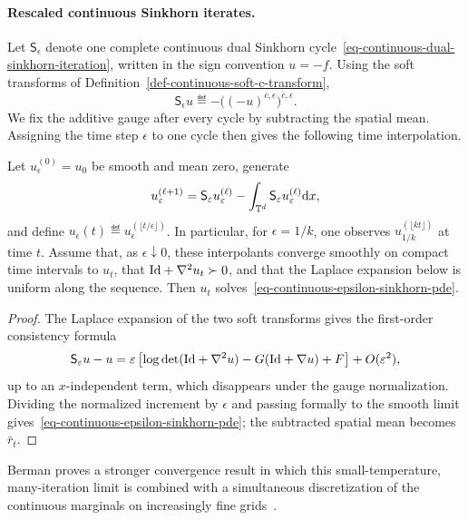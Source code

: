 \paragraph{Rescaled continuous Sinkhorn iterates.}

Let $\mathsf S_\epsilon$ denote one complete continuous dual Sinkhorn cycle~\eqref{eq-continuous-dual-sinkhorn-iteration}, written in the sign convention $u=-f$. Using the soft transforms of Definition~\ref{def-continuous-soft-c-transform},
\[
	\mathsf S_\epsilon u
	\eqdef
	-\Big((-u)^{c,\epsilon}\Big)^{\bar c,\epsilon}.
\]
We fix the additive gauge after every cycle by subtracting the spatial mean. Assigning the time step $\epsilon$ to one cycle then gives the following time interpolation.

\begin{prop}\label{prop-scaled-log-sinkhorn-limit}
	Let $u_\epsilon^{(0)}=u_0$ be smooth and mean zero, generate
	\[
		u_\varepsilon^{(\ell+1)}
		=
		\mathsf S_\varepsilon u_\varepsilon^{(\ell)}
		-
		\int_{\mathbb{T}^d}\mathsf S_\varepsilon u_\varepsilon^{(\ell)}\mathrm{d} x,
	\]
	and define $u_\epsilon(t)\eqdef u_\epsilon^{(\lfloor t/\epsilon\rfloor)}$. In particular, for $\epsilon=1/k$, one observes $u_{1/k}^{(\lfloor kt\rfloor)}$ at time $t$. Assume that, as $\epsilon\downarrow0$, these interpolants converge smoothly on compact time intervals to $u_t$, that $\mathrm{Id}+\nabla^2u_t\succ0$, and that the Laplace expansion below is uniform along the sequence. Then $u_t$ solves~\eqref{eq-continuous-epsilon-sinkhorn-pde}.
\end{prop}

\begin{proof}
	The Laplace expansion of the two soft transforms gives the first-order consistency formula
	\[
		\mathsf S_\varepsilon u-u
		=
		\varepsilon\left[
			\log\det(\mathrm{Id}+\nabla^2u)
			-G(\mathrm{Id}+\nabla u)+F
		\right]
		+O(\varepsilon^2),
	\]
	up to an $x$-independent term, which disappears under the gauge normalization. Dividing the normalized increment by $\epsilon$ and passing formally to the smooth limit gives~\eqref{eq-continuous-epsilon-sinkhorn-pde}; the subtracted spatial mean becomes $\bar r_t$.
\end{proof}

Berman proves a stronger convergence result in which this small-temperature, many-iteration limit is combined with a simultaneous discretization of the continuous marginals on increasingly fine grids~\cite{berman2017sinkhorn}.

